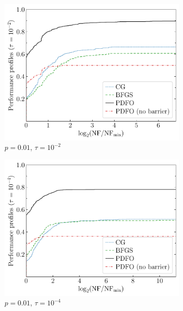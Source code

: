 \documentclass[
    smallextended,  %
    final,          %
]{svjour3}
\begin{document}
\begin{figure}[htbp]
    \begin{subfigure}{.48\textwidth}
        \centering
        \includegraphics[width=\textwidth]{perf-nan-bfgs_cg_pdfo-50-0.01-2}
        \caption{$p = 0.01$, $\tau = 10^{-2}$}
    \end{subfigure}
    \hfill
    \begin{subfigure}{.48\textwidth}
        \centering
        \includegraphics[width=\textwidth]{perf-nan-bfgs_cg_pdfo-50-0.01-4}
        \caption{$p = 0.01$, $\tau = 10^{-4}$}
    \end{subfigure}
    \hfill
    \begin{subfigure}{.48\textwidth}

\end{subfigure}
\end{figure}
\end{document}
